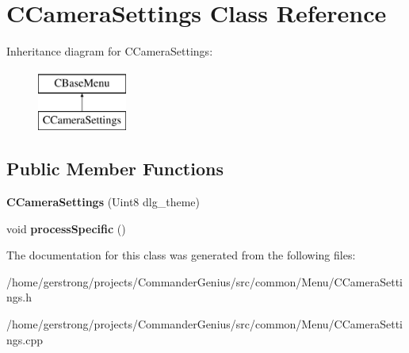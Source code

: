 \hypertarget{class_c_camera_settings}{
\section{CCameraSettings Class Reference}
\label{class_c_camera_settings}
}
Inheritance diagram for CCameraSettings:\begin{figure}[H]
\begin{center}
\leavevmode
\includegraphics[height=2cm]{class_c_camera_settings}
\end{center}
\end{figure}
\subsection*{Public Member Functions}
\begin{DoxyCompactItemize}
\item 
\hypertarget{class_c_camera_settings_afc60aea2840715722f2cca76ff2d726f}{
{\bfseries CCameraSettings} (Uint8 dlg\_\-theme)}
\label{class_c_camera_settings_afc60aea2840715722f2cca76ff2d726f}

\item 
\hypertarget{class_c_camera_settings_a8da1dfb3b30000091b8062c4b4fd118e}{
void {\bfseries processSpecific} ()}
\label{class_c_camera_settings_a8da1dfb3b30000091b8062c4b4fd118e}

\end{DoxyCompactItemize}


The documentation for this class was generated from the following files:\begin{DoxyCompactItemize}
\item 
/home/gerstrong/projects/CommanderGenius/src/common/Menu/CCameraSettings.h\item 
/home/gerstrong/projects/CommanderGenius/src/common/Menu/CCameraSettings.cpp\end{DoxyCompactItemize}
